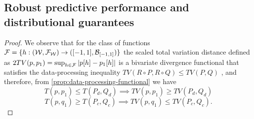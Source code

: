 \subsection{Robust predictive performance and distributional guarantees}

\predictive*

\begin{proof}
    We observe that for the class of functions $\mathcal{F}= \{h: (\mathcal{W}, \mathcal{F}_{\mathcal{W}}) \to ([-1,1], \mathcal{B}_{[-1,1]})\}$ the scaled total variation distance defined as $2TV(p,p_1)= \sup_{h\in \mathcal{F}} |p[h]-p_1[h]|$ is a bivariate divergence functional that satisfies the data-processing inequality  $TV(R\circ P, R\circ Q) \leq TV(P,Q)$ \citet[Theorems 7.4 and 7.7]{polyanskiy_wu_2025}, and therefore, from \ref{prop:data-processing-functional} we have 
    \begin{equation*}
        T(p,p_1) \leq T(P_d, Q_d) \implies TV(p,p_1) \geq TV(P_d,Q_d)
    \end{equation*}
    \begin{equation*}
        T(p,q_1) \geq T(P_c, Q_c) \implies TV(p,q_1) \leq TV(P_c,Q_c).
    \end{equation*}
\end{proof}

